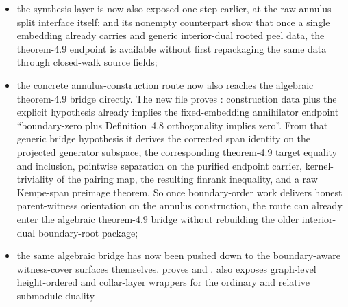 \documentclass[11pt]{article}
\begin{document}
\begin{itemize}
and
show that honest closed-walk and successor-cycle boundary-order data already
yield 
through the root-distance annulus construction, before any annihilator or
synthesis packaging is applied;
\item the synthesis layer is now also exposed one step earlier, at the raw
annulus-split interface itself:
and its nonempty counterpart show that once a single embedding already carries
 and generic interior-dual rooted peel
data, the theorem-4.9 endpoint is available without first repackaging the same
data through closed-walk source fields;
\item the concrete annulus-construction route now also reaches the algebraic
theorem-4.9 bridge directly.  The new file
 proves
:
construction data plus the explicit  hypothesis
already implies the fixed-embedding annihilator endpoint ``boundary-zero plus
Definition~4.8 orthogonality implies zero''.  From that generic bridge
hypothesis it derives the corrected span identity on the projected generator
subspace, the corresponding theorem-4.9 target equality and inclusion,
pointwise separation on the purified endpoint carrier, kernel-triviality of the
pairing map, the resulting finrank inequality, and a raw Kempe-span preimage
theorem.  So once boundary-order work delivers honest parent-witness
orientation on the annulus construction, the route can already enter the
algebraic theorem-4.9 bridge without rebuilding the older interior-dual
boundary-root package;
\item the same algebraic bridge has now been pushed down to the boundary-aware
witness-cover surfaces themselves.   proves
and
.
 also exposes graph-level height-ordered and
collar-layer wrappers for the ordinary and relative submodule-duality

\end{itemize}
\end{document}
